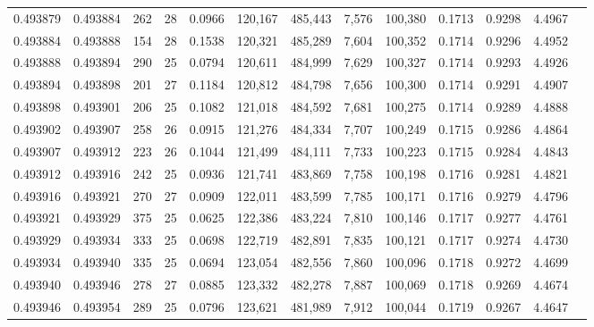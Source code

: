 \begin{tabular}{rrrrrrrrrrrrr}
0.493879 & 0.493884 & 262 &  28 &                                     0.0966 & 120,167 & 485,443 &   7,576 & 100,380 & 0.1713 & 0.9298 & 4.4967 \\
0.493884 & 0.493888 & 154 &  28 &                                     0.1538 & 120,321 & 485,289 &   7,604 & 100,352 & 0.1714 & 0.9296 & 4.4952 \\
0.493888 & 0.493894 & 290 &  25 &                                     0.0794 & 120,611 & 484,999 &   7,629 & 100,327 & 0.1714 & 0.9293 & 4.4926 \\
0.493894 & 0.493898 & 201 &  27 &                                     0.1184 & 120,812 & 484,798 &   7,656 & 100,300 & 0.1714 & 0.9291 & 4.4907 \\
0.493898 & 0.493901 & 206 &  25 &                                     0.1082 & 121,018 & 484,592 &   7,681 & 100,275 & 0.1714 & 0.9289 & 4.4888 \\
0.493902 & 0.493907 & 258 &  26 &                                     0.0915 & 121,276 & 484,334 &   7,707 & 100,249 & 0.1715 & 0.9286 & 4.4864 \\
0.493907 & 0.493912 & 223 &  26 &                                     0.1044 & 121,499 & 484,111 &   7,733 & 100,223 & 0.1715 & 0.9284 & 4.4843 \\
0.493912 & 0.493916 & 242 &  25 &                                     0.0936 & 121,741 & 483,869 &   7,758 & 100,198 & 0.1716 & 0.9281 & 4.4821 \\
0.493916 & 0.493921 & 270 &  27 &                                     0.0909 & 122,011 & 483,599 &   7,785 & 100,171 & 0.1716 & 0.9279 & 4.4796 \\
0.493921 & 0.493929 & 375 &  25 &                                     0.0625 & 122,386 & 483,224 &   7,810 & 100,146 & 0.1717 & 0.9277 & 4.4761 \\
0.493929 & 0.493934 & 333 &  25 &                                     0.0698 & 122,719 & 482,891 &   7,835 & 100,121 & 0.1717 & 0.9274 & 4.4730 \\
0.493934 & 0.493940 & 335 &  25 &                                     0.0694 & 123,054 & 482,556 &   7,860 & 100,096 & 0.1718 & 0.9272 & 4.4699 \\
0.493940 & 0.493946 & 278 &  27 &                                     0.0885 & 123,332 & 482,278 &   7,887 & 100,069 & 0.1718 & 0.9269 & 4.4674 \\
0.493946 & 0.493954 & 289 &  25 &                                     0.0796 & 123,621 & 481,989 &   7,912 & 100,044 & 0.1719 & 0.9267 & 4.4647 \\

\end{tabular}
